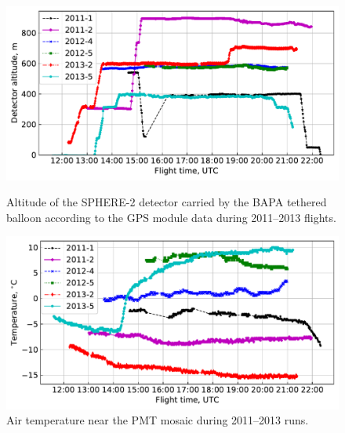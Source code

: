 \documentclass[universe,article,submit,moreauthors,pdftex]{Definitions/mdpi}
\begin{document}
\begin{figure}[tb]    
    \begin{minipage}[t]{0.48\textwidth}
        \centering
        \includegraphics[width=\textwidth]{Telemetry_height.pdf}
        \caption{Altitude of the SPHERE-2 detector carried by the BAPA tethered balloon according to the GPS module data during 2011--2013 flights.}
        \label{fig:height}
    \end{minipage}
    \hfill
    \begin{minipage}[t]{0.48\textwidth}
        \centering
        \includegraphics[width=\textwidth]{Telemetry_tmos.pdf}
        \caption{Air temperature near the PMT mosaic during 2011--2013 runs.}
        \label{fig:temperature}
    \end{minipage}
\end{figure}
\end{document}
